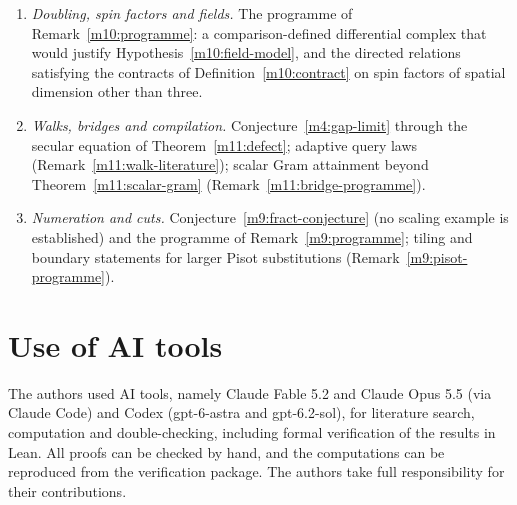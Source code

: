 \documentclass[11pt,reqno]{amsart}
\theoremstyle{definition}
\theoremstyle{remark}
\numberwithin{equation}{section}
\begin{document}
\begin{enumerate}[label=\textbf{Q\arabic*.},leftmargin=2.6em]
refinement (values $1.047198$, $1.237365$, $1.343633$, $1.468071$, $1.503815$ at $j=0,\dots,4$); and the programmes of
Remark~\ref{m8:programmes}.
\item \emph{Doubling, spin factors and fields.}  The programme of Remark~\ref{m10:programme}: a comparison-defined differential
complex that would justify Hypothesis~\ref{m10:field-model}, and the directed relations satisfying the contracts of
Definition~\ref{m10:contract} on spin factors of spatial dimension other than three.
\item \emph{Walks, bridges and compilation.}  Conjecture~\ref{m4:gap-limit} through the secular equation of Theorem~\ref{m11:defect};
adaptive query laws (Remark~\ref{m11:walk-literature}); scalar Gram attainment beyond Theorem~\ref{m11:scalar-gram}
(Remark~\ref{m11:bridge-programme}).
\item \emph{Numeration and cuts.}  Conjecture~\ref{m9:fract-conjecture} (no scaling example is established) and the programme of
Remark~\ref{m9:programme}; tiling and boundary statements for larger Pisot substitutions (Remark~\ref{m9:pisot-programme}).
\end{enumerate}

\section*{Use of AI tools}
The authors used AI tools, namely Claude Fable 5.2 and Claude Opus 5.5 (via Claude Code) and Codex (gpt-6-astra and gpt-6.2-sol), for literature search, computation and double-checking, including formal verification of the results in Lean. All proofs can be checked by hand, and the computations can be reproduced from the verification package. The authors take full responsibility for their contributions.
\end{document}

